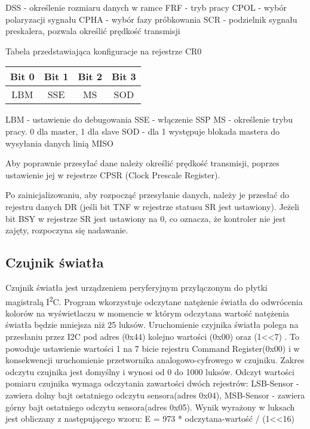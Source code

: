 \documentclass{classrep}
\begin{document}
	 
	 \textbullet DSS  - określenie rozmiaru danych w ramce
	 \textbullet FRF  - tryb pracy
	 \textbullet CPOL - wybór polaryzacji sygnału
	 \textbullet CPHA - wybór fazy próbkowania
	 \textbullet SCR  - podzielnik sygnału preskalera, pozwala określić prędkość transmisji 
		  
			 
		\begin{center}
			Tabela przedstawiająca konfiguracje na rejestrze CR0
			
			
			\begin{tabular}{|c|c|c|c|}
				\hline 
				Bit 0  & Bit 1  & Bit 2  & Bit 3  \\ 
				\hline 
				LBM & SSE  & MS  & SOD \\ 
				\hline 
			\end{tabular} 
		\end{center}
	
	\textbullet LBM - ustawienie do debugowania
	\textbullet SSE - włączenie SSP
	\textbullet MS  - określenie trybu pracy. 0 dla master, 1 dla slave
	\textbullet SOD - dla 1 występuje blokada mastera do wysyłania danych linią MISO
	
	
	Aby poprawnie przesyłać dane należy określić prędkość transmisji, poprzes ustawienie jej w rejestrze CPSR (Clock Prescale Register).
	
	
	Po zainicjalizowaniu, aby rozpocząć przesyłanie danych, należy je przesłać do rejestru danych DR (jeśli bit TNF w rejestrze statusu SR jest ustawiony). Jeżeli bit BSY w rejestrze SR jest ustawiony na 0, co oznacza, że kontroler nie jest zajęty, rozpoczyna się nadawanie.
		
		\subsection{Czujnik światła}
Czujnik światła jest urządzeniem peryferyjnym przyłączonym do płytki magistralą I\textsuperscript2C. Program wkorzystuje odczytane natężenie światła do odwrócenia kolorów na 			wyświetlaczu w momencie w którym odczytana wartość natężenia światła będzie mniejsza niż 25 luksów. Uruchomienie czyjnika światła polega na przesłaniu przez	
I2C pod adres (0x44) kolejno wartości (0x00) oraz (1<<7) . To powoduje ustawienie wartości 1 na 7 bicie rejestru Command Register(0x00) i w konsekwencji 	uruchomienie przetwornika analogowo-cyfrowego w czujniku. Zakres odczytu czujnika jest domyślny i wynosi od 0 do 1000 luksów. Odczyt wartości pomiaru czujnika wymaga 				odczytania zawartości dwóch rejestrów:  LSB-Sensor - zawiera dolny bajt ostatniego odczytu sensora(adres 0x04), MSB-Sensor - zawiera górny bajt ostatniego odczytu 					sensora(adres 0x05). Wynik wyrażony w luksach jest obliczany z następującego wzoru: E = 973 * odczytana-wartość /  (1<<16)
\end{document}
